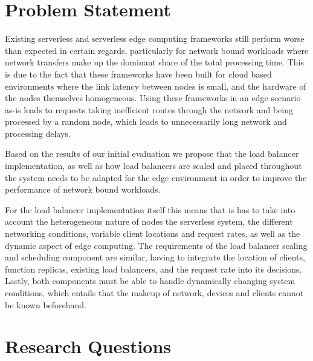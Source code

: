 \documentclass[draft,final]{vutinfth} %
\begin{document}
\section{Problem Statement}




Existing serverless and serverless edge computing frameworks still perform worse than expected in certain regards, particularly for network bound workloads where network transfers make up the dominant share of the total processing time\cite{skippy}.
This is due to the fact that these frameworks have been built for cloud based environments where the link latency between nodes is small, and the hardware of the nodes themselves homogeneous.
Using these frameworks in an edge scenario as-is leads to requests taking inefficient routes through the network and being processed by a random node, which leads to unnecessarily long network and processing delays.

Based on the results of our initial evaluation we propose that the load balancer implementation, as well as how load balancers are scaled and placed throughout the system needs to be adapted for the edge environment in order to improve the performance of network bound workloads.

For the load balancer implementation itself this means that is has to take into account the heterogeneous nature of nodes the serverless system, the different networking conditions, variable client locations and request rates, as well as the dynamic aspect of edge computing.
The requirements of the load balancer scaling and scheduling component are similar, having to integrate the location of clients, function replicas, existing load balancers, and the request rate into its decisions.
Lastly, both components must be able to handle dynamically changing system conditions, which entails that the makeup of network, devices and clients cannot be known beforehand.
\section{Research Questions}
\end{document}
